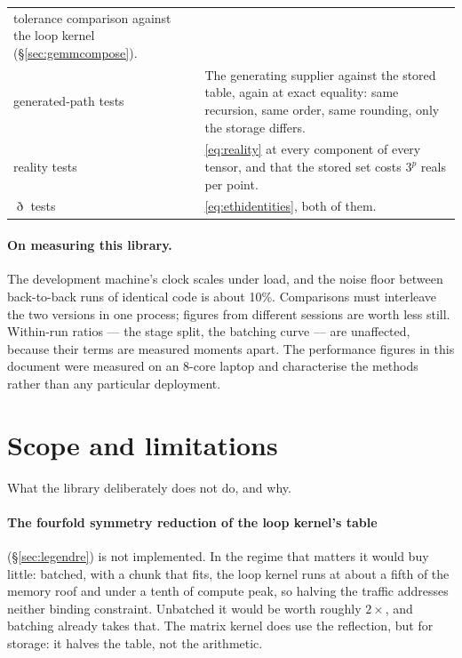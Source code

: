 \documentclass[11pt,a4paper]{article}
\begin{document}
\begin{center}
\begin{tabular}{lp{9.2cm}}
      tolerance comparison against the loop kernel
      (\S\ref{sec:gemmcompose}). \\
  generated-path tests
    & The generating supplier against the stored table, again at exact
      equality: same recursion, same order, same rounding, only the
      storage differs. \\
  reality tests
    & \eqref{eq:reality} at every component of every tensor, and that the
      stored set costs $3^p$ reals per point. \\
  $\eth$ tests
    & \eqref{eq:ethidentities}, both of them. \\
  \bottomrule
\end{tabular}
\end{center}

\paragraph{On measuring this library.}  The development machine's clock
scales under load, and the noise floor between back-to-back runs of
identical code is about 10\%.  Comparisons must interleave the two
versions in one process; figures from different sessions are worth less
still.  Within-run ratios --- the stage split, the batching curve --- are
unaffected, because their terms are measured moments apart.  The
performance figures in this document were measured on an 8-core laptop
and characterise the methods rather than any particular deployment.

\section{Scope and limitations}
\label{sec:scope}

What the library deliberately does not do, and why.

\paragraph{The fourfold symmetry reduction of the loop kernel's table}
(\S\ref{sec:legendre}) is not implemented.  In the regime that matters it
would buy little: batched, with a chunk that fits, the loop kernel runs at
about a fifth of the memory roof and under a tenth of compute peak, so
halving the traffic addresses neither binding constraint.  Unbatched it
would be worth roughly $2\times$, and batching already takes that.  The
matrix kernel does use the reflection, but for storage: it halves the
table, not the arithmetic.
\end{document}
